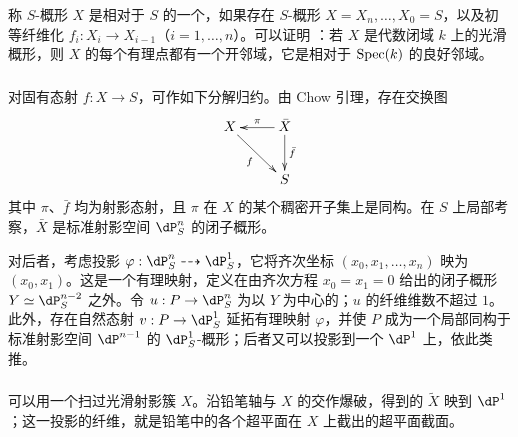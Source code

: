 称 $S$-概形 $X$ 是相对于 $S$ 的一个，如果存在 $S$-概形 $X=X_n,\dotsc,X_0=S$，以及初等纤维化 $f_i:X_i\to X_{i-1}$（$i=1,\dotsc,n$）。可以证明 \cite[XI 3.3]{sga4}：若 $X$ 是代数闭域 $k$ 上的光滑概形，则 $X$ 的每个有理点都有一个开邻域，它是相对于 $\operatorname{Spec}(k)$ 的良好邻域。

\subsubsection{}\label{I:3-4-3}
对固有态射 $f:X\to S$，可作如下分解归约。由 Chow 引理，存在交换图
\[\xymatrix{
 X\ar[dr]_-f&\ar[l]_-\pi\ar[d]^-{\bar f}\bar X\\
 &S
}\]
其中 $\pi$、$\bar f$ 均为射影态射，且 $\pi$ 在 $X$ 的某个稠密开子集上是同构。在 $S$ 上局部考察，$\bar X$ 是标准射影空间 $\dP_S^n$ 的闭子概形。

对后者，考虑投影 $\varphi:\dP_S^n\dashrightarrow\dP_S^1$，它将齐次坐标 $(x_0,x_1,\dotsc,x_n)$ 映为 $(x_0,x_1)$。这是一个有理映射，定义在由齐次方程 $x_0=x_1=0$ 给出的闭子概形 $Y\simeq\dP_S^{n-2}$ 之外。令 $u:P\to\dP_S^n$ 为以 $Y$ 为中心的；$u$ 的纤维维数不超过 $1$。此外，存在自然态射 $v:P\to\dP_S^1$ 延拓有理映射 $\varphi$，并使 $P$ 成为一个局部同构于标准射影空间 $\dP^{n-1}$ 的 $\dP_S^1$-概形；后者又可以投影到一个 $\dP^1$ 上，依此类推。

\subsubsection{}\label{I:3-4-4}
可以用一个扫过光滑射影簇 $X$。沿铅笔轴与 $X$ 的交作爆破，得到的 $\widetilde X$ 映到 $\dP^1$；这一投影的纤维，就是铅笔中的各个超平面在 $X$ 上截出的超平面截面。
